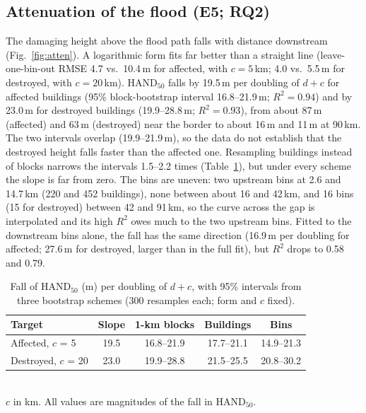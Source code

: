 \documentclass[journal,a4paper]{IEEEtran}
\begin{document}
\subsection{Attenuation of the flood (E5; RQ2)}\label{sec:atten}
The damaging height above the flood path falls with distance downstream (Fig.~\ref{fig:atten}). A logarithmic form fits far better than a straight line (leave-one-bin-out RMSE 4.7 vs.\ 10.4\,m for affected, with $c = 5$\,km; 4.0 vs.\ 5.5\,m for destroyed, with $c = 20$\,km). HAND$_{50}$ falls by 19.5\,m per doubling of $d + c$ for affected buildings (95\% block-bootstrap interval 16.8--21.9\,m; $R^2 = 0.94$) and by 23.0\,m for destroyed buildings (19.9--28.8\,m; $R^2 = 0.93$), from about 87\,m (affected) and 63\,m (destroyed) near the border to about 16\,m and 11\,m at 90\,km. The two intervals overlap (19.9--21.9\,m), so the data do not establish that the destroyed height falls faster than the affected one. Resampling buildings instead of blocks narrows the intervals 1.5--2.2 times (Table~\ref{tab:attboot}), but under every scheme the slope is far from zero. The bins are uneven: two upstream bins at 2.6 and 14.7\,km (220 and 452 buildings), none between about 16 and 42\,km, and 16 bins (15 for destroyed) between 42 and 91\,km, so the curve across the gap is interpolated and its high $R^2$ owes much to the two upstream bins. Fitted to the downstream bins alone, the fall has the same direction (16.9\,m per doubling for affected; 27.6\,m for destroyed, larger than in the full fit), but $R^2$ drops to 0.58 and 0.79.

\begin{table}[t]
\centering\footnotesize
\setlength{\tabcolsep}{4pt}
\caption{Fall of HAND$_{50}$ (m) per doubling of $d + c$, with 95\% intervals from three bootstrap schemes (300 resamples each; form and $c$ fixed).}\label{tab:attboot}
\setlength{\tabcolsep}{3pt}
\begin{tabular}{@{}lcccc@{}}
\toprule
\textbf{Target} & \textbf{Slope} & \textbf{1-km blocks} & \textbf{Buildings} & \textbf{Bins}\\
\midrule
Affected, $c$ = 5 & 19.5 & 16.8--21.9 & 17.7--21.1 & 14.9--21.3\\
Destroyed, $c$ = 20 & 23.0 & 19.9--28.8 & 21.5--25.5 & 20.8--30.2\\
\bottomrule
\end{tabular}\\[1pt]
{\scriptsize $c$ in km. All values are magnitudes of the fall in HAND$_{50}$.}
\end{table}
\end{document}
